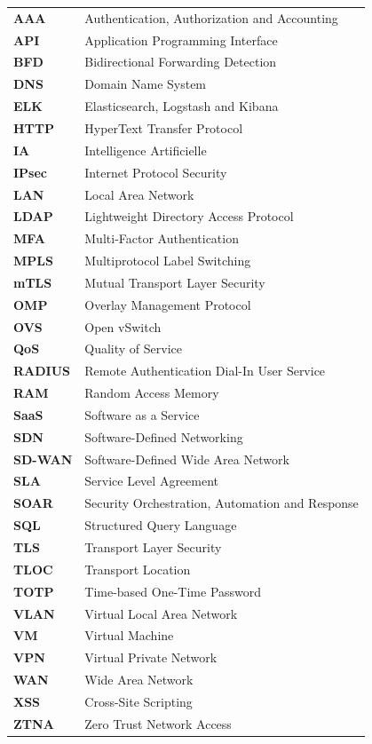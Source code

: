 \documentclass[12pt,a4paper,oneside]{report}
\begin{document}
\begin{longtable}{>{\bfseries}p{3.5cm}p{10.5cm}}
AAA & Authentication, Authorization and Accounting\\
API & Application Programming Interface\\
BFD & Bidirectional Forwarding Detection\\
DNS & Domain Name System\\
ELK & Elasticsearch, Logstash and Kibana\\
HTTP & HyperText Transfer Protocol\\
IA & Intelligence Artificielle\\
IPsec & Internet Protocol Security\\
LAN & Local Area Network\\
LDAP & Lightweight Directory Access Protocol\\
MFA & Multi-Factor Authentication\\
MPLS & Multiprotocol Label Switching\\
mTLS & Mutual Transport Layer Security\\
OMP & Overlay Management Protocol\\
OVS & Open vSwitch\\
QoS & Quality of Service\\
RADIUS & Remote Authentication Dial-In User Service\\
RAM & Random Access Memory\\
SaaS & Software as a Service\\
SDN & Software-Defined Networking\\
SD-WAN & Software-Defined Wide Area Network\\
SLA & Service Level Agreement\\
SOAR & Security Orchestration, Automation and Response\\
SQL & Structured Query Language\\
TLS & Transport Layer Security\\
TLOC & Transport Location\\
TOTP & Time-based One-Time Password\\
VLAN & Virtual Local Area Network\\
VM & Virtual Machine\\
VPN & Virtual Private Network\\
WAN & Wide Area Network\\
XSS & Cross-Site Scripting\\
ZTNA & Zero Trust Network Access\\
\end{longtable}
\end{document}
